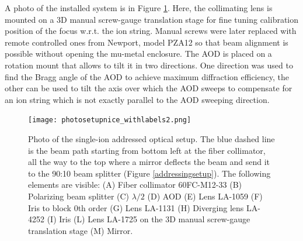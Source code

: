 A photo of the installed system is in Figure \ref{photosetup}. Here, the collimating lens is mounted on a 3D manual screw-gauge translation stage for fine tuning calibration position of the focus w.r.t. the ion string. Manual screws were later replaced with remote controlled ones from Newport, model PZA12 so that beam alignment is possible without opening the mu-metal enclosure. The AOD is placed on a rotation mount that allows to tilt it in two directions. One direction was used to find the Bragg angle of the AOD to achieve maximum diffraction efficiency, the other can be used to tilt the axis over which the AOD sweeps to compensate for an ion string which is not exactly parallel to the AOD sweeping direction.

\begin{figure}
\centering
\texttt{[image: photosetupnice\_withlabels2.png]}
\caption{Photo of the single-ion addressed optical setup. The blue dashed line is the beam path starting from bottom left at the fiber collimator, all the way to the top where a mirror deflects the beam and send it to the 90:10 beam splitter (Figure \ref{addressingsetup}). The following elements are visible: (A) Fiber collimator 60FC-M12-33 (B) Polarizing beam splitter (C) $\lambda/2$ (D) AOD (E) Lens LA-1059 (F) Iris to block 0th order (G) Lens LA-1131 (H) Diverging lens LA-4252 (I) Iris (L) Lens LA-1725 on the 3D manual screw-gauge translation stage (M) Mirror. }
\label{photosetup}
\end{figure}
